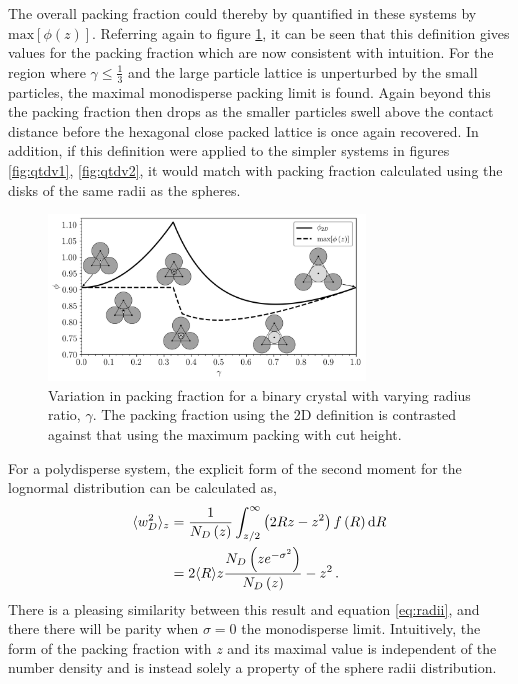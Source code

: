 The overall packing fraction could thereby by quantified in these systems by $\text{max}\left[\phi\left(z\right)\right]$.
Referring again to figure \ref{fig:crystalpackingfrac}, it can be seen that this definition gives values for the packing fraction which are now consistent with intuition.
For the region where $\gamma\leq\frac{1}{3}$ and the large particle lattice is unperturbed by the small particles, the maximal monodisperse packing limit is found.
Again beyond this the packing fraction then drops as the smaller particles swell above the contact distance before the hexagonal close packed lattice is once again recovered.
In addition, if this definition were applied to the simpler systems in figures \ref{fig:qtdv1}, \ref{fig:qtdv2}, it would match with packing fraction calculated using the disks of the same radii as the spheres. 

\begin{figure}[bt]
	\centering
	\includegraphics[width=0.75\textwidth]{./figures/quasi2d/max_packing.pdf}
	\caption{Variation in packing fraction for a binary crystal with varying radius ratio, $\gamma$. The packing fraction using the 2D definition is contrasted against that using the maximum packing with cut height.}
	\label{fig:crystalpackingfrac}
\end{figure}

For a polydisperse system, the explicit form of the second moment for the lognormal distribution can be calculated as,
\begin{align}
	\label{eq:wiid}
	\langle w_D^2 \rangle_z &= \frac{1}{N_D\left(z\right)}\int_{z/2}^\infty  \left(2Rz-z^2\right) f\left(R\right) \text{d} R \nonumber \\
	&= 2\langle R\rangle z\frac{N_D\left(ze^{-\sigma^2}\right)}{N_D\left(z\right)}-z^2\,.
\end{align}
There is a pleasing similarity between this result and equation \eqref{eq:radii}, and there there will be parity when $\sigma=0$ \ie{} the monodisperse limit. 
Intuitively, the form of the packing fraction with $z$ and its maximal value is independent of the number density and is instead solely a property of the sphere radii distribution. 

